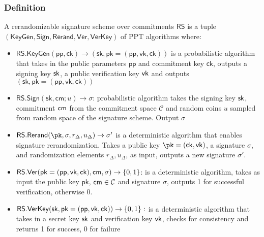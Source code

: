 \subsubsection{Definition}
\begin{definition}
    A rerandomizable signature scheme over commitments $\mathsf{RS}$ is a tuple $(\mathsf{KeyGen}, \mathsf{Sign}, \mathsf{Rerand}, \mathsf{Ver}, \mathsf{VerKey})$ of PPT algorithms where:
        \begin{itemize}
            \item $\mathsf{RS.KeyGen(pp, ck)} \to \mathsf{(sk, pk = (pp, vk, ck))}$ is a probabilistic algorithm that takes in the public parameters $\mathsf{pp}$ and commitment key $\mathsf{ck}$, outputs a signing key $\mathsf{sk}$, a public verification key $\mathsf{vk}$ and outputs $\mathsf{(sk, pk = (pp, vk, ck))}$

            \item $\mathsf{RS.Sign}(\mathsf{sk, cm};u ) \to \sigma$: probabilistic algorithm takes the signing key $\mathsf{sk}$, commitment $\mathsf{cm}$ from the commitment space $\mathcal{C}$ and random coins $u$ sampled from random space of the signature scheme. Output $\sigma$

            \item $\mathsf{RS.Rerand}(\pk, \sigma, r_\Delta, u_\Delta) \rightarrow \sigma'$ is a deterministic algorithm that enables signature rerandomization. Takes a public key $\pk = (\mathsf{ck,vk})$, a signature $\sigma$, and randomization elements $r_\Delta, u_\Delta$, as input, outputs a new signature $\sigma'$. 

            \item $\mathsf{RS.Ver}(\mathsf{pk = (pp, vk, ck), cm}, \sigma) \rightarrow \{0,1\}$: is a deterministic algorithm, takes as input the public key $\mathsf{pk}$, $\mathsf{cm} \in \mathcal{C}$ and signature $\sigma$, outputs 1 for successful verification, otherwise 0. 

            \item $\mathsf{RS.VerKey}(\mathsf{sk, pk = (pp, vk, ck)}) \to \{0,1\}:$ is a deterministic algorithm that takes in a secret key $\mathsf{sk}$ and verification key $\mathsf{vk}$, checks for consistency and returns 1 for success, 0 for failure
        \end{itemize}
\end{definition}


